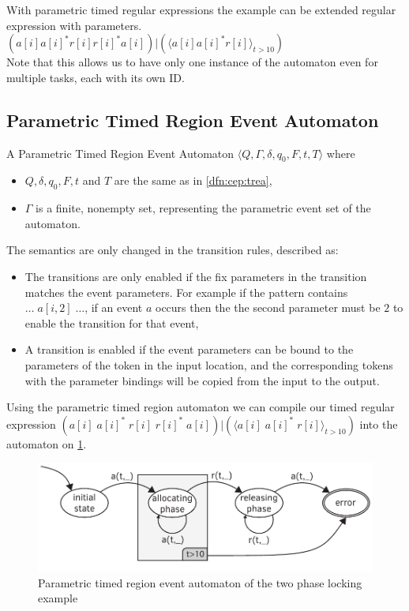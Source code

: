 			With parametric timed regular expressions the example can be extended regular expression with parameters. \\
			$(a[i] a[i]^\ast  r[i] r[i]^\ast a[i]) | (\langle a[i] a[i]^\ast r[i]\rangle_{t > 10} )$ \\ 
			Note that this allows us to have only one instance of the automaton even for multiple tasks, each with its own ID.
		
		\subsection{Parametric Timed Region Event Automaton}
			
			

			\begin{dfn}
				\label{dfn:cep:ptrea}
				A Parametric Timed Region Event Automaton $\langle Q,\Gamma,\delta,q_0, F, t, T \rangle$ where
				\begin{itemize}
					\item $Q, \delta, q_0, F, t$ and  $T$ are the same as in \cref{dfn:cep:trea},
					\item $\Gamma$ is a finite, nonempty set, representing the parametric event set of the automaton.
				\end{itemize}
			\end{dfn}


			The semantics are only changed in the transition rules, described as:
			\begin{itemize}
				\item The transitions are only enabled if the fix parameters in the transition matches the event parameters. For example if the pattern contains $\dots \; a[i,2] \; \dots$, if an event $a$ occurs then the the second parameter must be $2$ to enable the transition for that event,
				\item A transition is enabled if the event parameters can be bound to the parameters of the token in the input location, and the corresponding tokens with the parameter bindings will be copied from the input to the output.
			\end{itemize}
	
			Using the parametric timed region automaton we can compile our timed regular expression 
			$(a[i] \; a[i]^\ast \; r[i] \; r[i]^\ast \; a[i]) | (\langle a[i] \; a[i]^\ast \; r[i]\rangle_{t > 10} )$ into the automaton on \cref{fig:cep:ptrea}.
	
	
			\begin{figure}[h]
			\centering
			\includegraphics[width=0.7\linewidth]{figures/chapter_4/allocating_timed_parametric}
			\caption{Parametric timed region event automaton of the two phase locking example \redraw}
			\label{fig:cep:ptrea}
			\end{figure}
	
